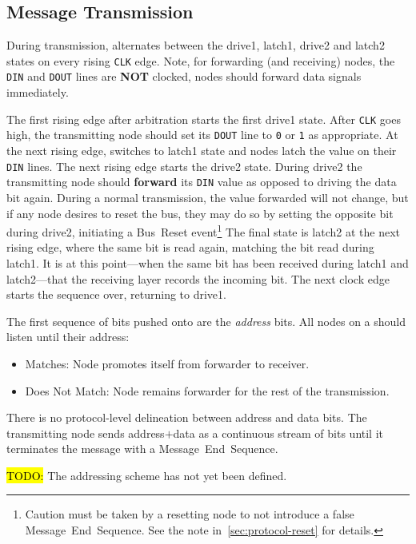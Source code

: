 \subsection{Message Transmission}
\label{sec:protocol-transmission}
During transmission, \bus alternates between the {\sc drive1}, {\sc latch1},
{\sc drive2} and {\sc latch2} states on every rising {\tt CLK} edge. 
Note, for forwarding (and receiving) nodes, the {\tt DIN} and {\tt DOUT} lines 
are {\bf NOT} clocked, nodes should forward data signals immediately.

The first rising edge after arbitration starts the first {\sc drive1} state.
After {\tt CLK} goes high, the transmitting node should set its {\tt DOUT}
line to {\tt 0} or {\tt 1} as appropriate. At the next rising edge, \bus
switches to {\sc latch1} state and nodes latch the value on their {\tt DIN}
lines. The next rising edge starts the {\sc drive2} state. During {\sc drive2}
the transmitting node should \textbf{forward} its {\tt DIN} value as opposed
to driving the data bit again. During a normal
transmission, the value forwarded will not change, but if any node desires to
reset the bus, they may do so by setting the opposite bit during {\sc drive2},
initiating a Bus~Reset event\footnote{
  Caution must be taken by a resetting node to not introduce a false
  Message~End~Sequence. See the note in~\ref{sec:protocol-reset} for details.}
The final state is {\sc latch2} at the next rising edge, where the same bit is
read again, matching the bit read during {\sc latch1}.  It is at this
point---when the same bit has been received during {\sc latch1} and {\sc
latch2}---that the receiving layer records the incoming bit. The next clock
edge starts the sequence over, returning to {\sc drive1}.

The first sequence of bits pushed onto \bus are the {\em address} bits. All
nodes on a \bus should listen until their address:
\begin{itemize}
  \item Matches: Node promotes itself from forwarder to receiver.
  \item Does Not Match: Node remains forwarder for the rest of the
    transmission.
\end{itemize}

There is no protocol-level delineation between address and data bits. The
transmitting node sends address$+$data as a continuous stream of bits until
it terminates the message with a Message~End~Sequence.

\hl{TODO:} The \bus addressing scheme has not yet been defined.

